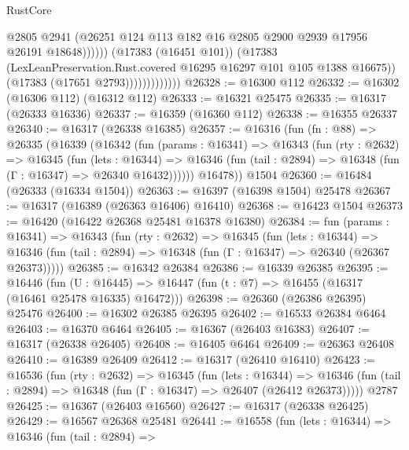 \begin{lexlean}{RustCore}
\begin{coremodule}
                                    @2805
                                    @2941
                                    (@26251
                                      @124
                                      @113
                                      @182
                                      @16
                                      @2805
                                      @2900
                                      @2939
                                      @17956
                                      @26191
                                      @18648))))))
                          (@17383 (@16451 @101))
                          (@17383
                            (LexLeanPreservation.Rust.covered @16295 @16297 @101 @105 @1388 @16675))
                          (@17383 (@17651 @2793)))))))))))))
@26328 := @16300 @112
@26332 := @16302 (@16306 @112) (@16312 @112)
@26333 := @16321 @25475
@26335 := @16317 (@26333 @16336)
@26337 := @16359 (@16360 @112)
@26338 := @16355 @26337
@26340 := @16317 (@26338 @16385)
@26357 := @16316
    (fun (fn : @88) =>
    @26335
      (@16339
        (@16342
          (fun (params : @16341) =>
          @16343
            (fun (rty : @2632) =>
            @16345
              (fun (lets : @16344) =>
              @16346 (fun (tail : @2894) => @16348 (fun (Γ : @16347) => @26340 @16432))))))
        @16478))
    @1504
@26360 := @16484 (@26333 (@16334 @1504))
@26363 := @16397 (@16398 @1504) @25478
@26367 := @16317 (@16389 (@26363 @16406) @16410)
@26368 := @16423 @1504
@26373 := @16420 (@16422 @26368 @25481 @16378 @16380)
@26384 := fun (params : @16341) =>
  @16343
    (fun (rty : @2632) =>
    @16345
      (fun (lets : @16344) =>
      @16346 (fun (tail : @2894) => @16348 (fun (Γ : @16347) => @26340 (@26367 @26373)))))
@26385 := @16342 @26384
@26386 := @16339 @26385
@26395 := @16446
    (fun (U : @16445) => @16447 (fun (t : @7) => @16455 (@16317 (@16461 @25478 @16335) @16472)))
@26398 := @26360 (@26386 @26395) @25476
@26400 := @16302 @26385 @26395
@26402 := @16533 @26384 @6464
@26403 := @16370 @6464
@26405 := @16367 (@26403 @16383)
@26407 := @16317 (@26338 @26405)
@26408 := @16405 @6464
@26409 := @26363 @26408
@26410 := @16389 @26409
@26412 := @16317 (@26410 @16410)
@26423 := @16536
    (fun (rty : @2632) =>
    @16345
      (fun (lets : @16344) =>
      @16346 (fun (tail : @2894) => @16348 (fun (Γ : @16347) => @26407 (@26412 @26373)))))
    @2787
@26425 := @16367 (@26403 @16560)
@26427 := @16317 (@26338 @26425)
@26429 := @16567 @26368 @25481
@26441 := @16558
    (fun (lets : @16344) =>
    @16346
      (fun (tail : @2894) =>

\end{coremodule}
\end{lexlean}

